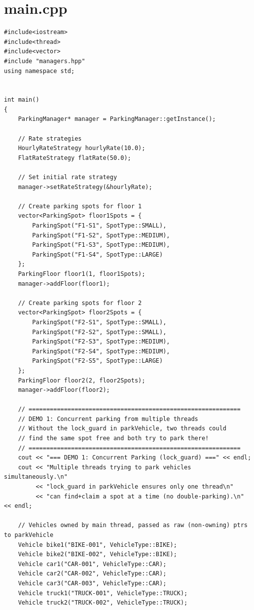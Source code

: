 \documentclass[11pt,a4paper]{article}
\begin{document}
\section{main.cpp}
\begin{lstlisting}[title={\texttt{main.cpp}}]
#include<iostream>
#include<thread>
#include<vector>
#include "managers.hpp"
using namespace std;


int main()
{
    ParkingManager* manager = ParkingManager::getInstance();

    // Rate strategies
    HourlyRateStrategy hourlyRate(10.0);
    FlatRateStrategy flatRate(50.0);

    // Set initial rate strategy
    manager->setRateStrategy(&hourlyRate);

    // Create parking spots for floor 1
    vector<ParkingSpot> floor1Spots = {
        ParkingSpot("F1-S1", SpotType::SMALL),
        ParkingSpot("F1-S2", SpotType::MEDIUM),
        ParkingSpot("F1-S3", SpotType::MEDIUM),
        ParkingSpot("F1-S4", SpotType::LARGE)
    };
    ParkingFloor floor1(1, floor1Spots);
    manager->addFloor(floor1);

    // Create parking spots for floor 2
    vector<ParkingSpot> floor2Spots = {
        ParkingSpot("F2-S1", SpotType::SMALL),
        ParkingSpot("F2-S2", SpotType::SMALL),
        ParkingSpot("F2-S3", SpotType::MEDIUM),
        ParkingSpot("F2-S4", SpotType::MEDIUM),
        ParkingSpot("F2-S5", SpotType::LARGE)
    };
    ParkingFloor floor2(2, floor2Spots);
    manager->addFloor(floor2);

    // ============================================================
    // DEMO 1: Concurrent parking from multiple threads
    // Without the lock_guard in parkVehicle, two threads could
    // find the same spot free and both try to park there!
    // ============================================================
    cout << "=== DEMO 1: Concurrent Parking (lock_guard) ===" << endl;
    cout << "Multiple threads trying to park vehicles simultaneously.\n"
         << "lock_guard in parkVehicle ensures only one thread\n"
         << "can find+claim a spot at a time (no double-parking).\n" << endl;

    // Vehicles owned by main thread, passed as raw (non-owning) ptrs to parkVehicle
    Vehicle bike1("BIKE-001", VehicleType::BIKE);
    Vehicle bike2("BIKE-002", VehicleType::BIKE);
    Vehicle car1("CAR-001", VehicleType::CAR);
    Vehicle car2("CAR-002", VehicleType::CAR);
    Vehicle car3("CAR-003", VehicleType::CAR);
    Vehicle truck1("TRUCK-001", VehicleType::TRUCK);
    Vehicle truck2("TRUCK-002", VehicleType::TRUCK);


\end{lstlisting}
\end{document}
